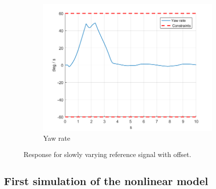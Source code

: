\documentclass[11pt]{article}
\begin{document}
\begin{enumerate}
\begin{figure}[ht]
\begin{subfigure}[c]{0.3\linewidth}
            \includegraphics[width=\linewidth]{Plots_06_ReferenceTracking_Varying/06}
            \caption{Yaw rate}
        \end{subfigure}
        \caption{Response for slowly varying reference signal with offset.}
        \label{fig:varying_reference_with_offset}
    \end{figure}
\end{enumerate}



\subsection*{First simulation of the nonlinear model} %
\label{sub:first_simulation_of_the_nonlinear_model}
\end{document}
